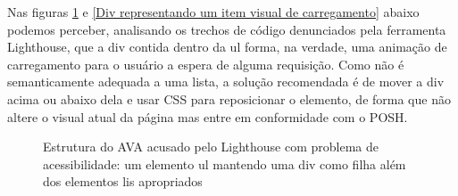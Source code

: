 \documentclass[
	12pt,				%
	openright,			%
	oneside,			%
	a4paper,			%
	chapter=TITLE,		%
	section=TITLE,		%
	subsection=TITLE,	%
	subsubsection=TITLE,%
	english,			%
	brazil				%
	]{abntex2}
\theoremstyle{definition}
\begin{document}
\begin{itemize}
Nas figuras \ref{Estrutura do AVA acusado pelo Lighthouse com problema de acessibilidade: um  elemento ul mantendo uma div como filha além dos elementos lis apropriados} e \ref{Div representando um item visual de carregamento} abaixo podemos perceber, analisando os trechos de código denunciados pela ferramenta Lighthouse, que a div contida dentro da ul forma, na verdade, uma animação de carregamento para o usuário a espera de alguma requisição. Como não é semanticamente adequada a uma lista, a solução recomendada é de mover a div acima ou abaixo dela e usar CSS para reposicionar o elemento, de forma que não altere o visual atual da página mas entre em conformidade com o POSH.

\begin{figure}[!h]
\centering
\caption{Estrutura do AVA acusado pelo Lighthouse com problema de acessibilidade: um  elemento ul mantendo uma div como filha além dos elementos lis apropriados}
\label{Estrutura do AVA acusado pelo Lighthouse com problema de acessibilidade: um  elemento ul mantendo uma div como filha além dos elementos lis apropriados}
\end{figure}


\end{itemize}
\end{document}
